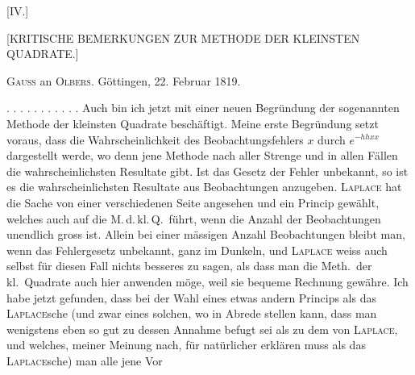 \clearpage
{}
\begin{center}
[IV.]

{\large [KRITISCHE BEMERKUNGEN ZUR METHODE DER KLEINSTEN QUADRATE.]}
\end{center}



\begin{center}
\textsc{Gauss} an \textsc{Olbers}. Göttingen, 22. Februar 1819.
\end{center}

\noindent . . . . . . . . . . . Auch bin ich jetzt mit einer neuen Begründung der sogenannten Methode der kleinsten Quadrate beschäftigt. Meine erste Begründung setzt voraus, dass die Wahrscheinlichkeit des Beobachtungsfehlers $x$ durch $e^{-hhxx}$ dargestellt werde, wo denn jene Methode nach aller Strenge und in allen Fällen die wahrscheinlichsten Resultate gibt. Ist das Gesetz der Fehler unbekannt, so ist es  die wahrscheinlichsten Resultate aus  Beobachtungen anzugeben. \textsc{Laplace} hat die Sache von einer verschiedenen Seite angesehen und ein Princip gewählt, welches auch auf die M.\,d.\,kl.\,Q.\ führt, wenn die Anzahl der Beobachtungen unendlich gross ist. Allein bei einer mässigen Anzahl Beobachtungen bleibt man, wenn das Fehlergesetz unbekannt, ganz im Dunkeln, und \textsc{Laplace} weiss auch selbst für diesen Fall nichts besseres zu sagen, als dass man die Meth.\ der kl.\ Quadrate auch hier anwenden möge, weil sie bequeme Rechnung gewähre. Ich habe jetzt gefunden, dass bei der Wahl eines etwas andern Princips als das \textsc{Laplace}sche (und zwar eines solchen, wo  in Abrede stellen kann, dass man wenigstens eben so gut zu dessen Annahme befugt sei als zu dem von \textsc{Laplace}, und welches, meiner Meinung nach,  für natürlicher erklären muss als das \textsc{Laplace}sche) man alle jene Vor%
